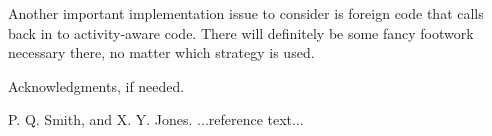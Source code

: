\documentclass[11pt,preprint]{sigplanconf}
\begin{document}
Another important implementation issue to consider is foreign code that
calls back in to activity-aware code.  There will definitely be some
fancy footwork necessary there, no matter which strategy is used.

\acks

Acknowledgments, if needed.





\begin{thebibliography}{}
\softraggedright

P. Q. Smith, and X. Y. Jones. ...reference text...

\end{thebibliography}
\end{document}
